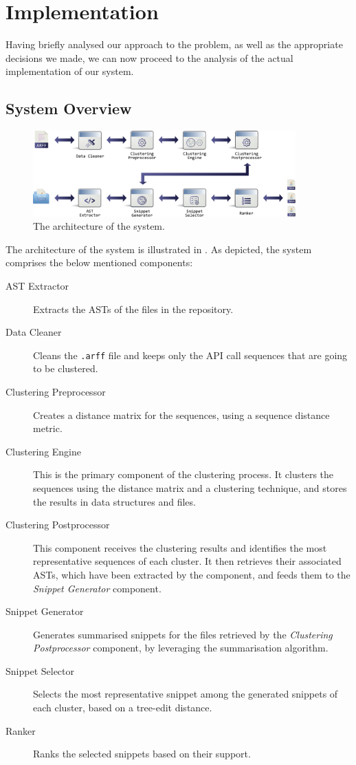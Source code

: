\chapter{Implementation}
\label{chap:implementation}

Having briefly analysed our approach to the problem, as well as the appropriate decisions we made, we can now proceed to the analysis of the actual implementation of our system.


\section{System Overview}
\label{sec:system-overview}

\begin{figure}[ht]
\centering
\includegraphics[width=0.9\textwidth]{images/system}
\caption[The architecture of the system]{The architecture of the system.}
\label{images:API-summariser}
\vspace{-2pt}
\end{figure} 

The architecture of the system is illustrated in . As depicted, the system comprises the below mentioned components:

\begin{description}
\item[AST Extractor] Extracts the ASTs of the files in the repository.
\item[Data Cleaner] Cleans the \texttt{.arff} file and keeps only the API call sequences that are going to be clustered. 
\item[Clustering Preprocessor] Creates a distance matrix for the sequences, using a sequence distance metric.
\item[Clustering Engine] This is the primary component of the clustering process. It clusters the sequences using the distance matrix and a clustering technique, and stores the results in data structures and files.
\item[Clustering Postprocessor] This component receives the clustering results and identifies the most representative sequences of each cluster. It then retrieves their associated ASTs, which have been extracted by the  component, and feeds them to the \textit{Snippet Generator} component.
\item[Snippet Generator] Generates summarised snippets for the files retrieved by the \textit{Clustering Postprocessor} component, by leveraging the summarisation algorithm.
\item[Snippet Selector] Selects the most representative snippet among the generated snippets of each cluster, based on a tree-edit distance.
\item[Ranker] Ranks the selected snippets based on their support.
\end{description}


